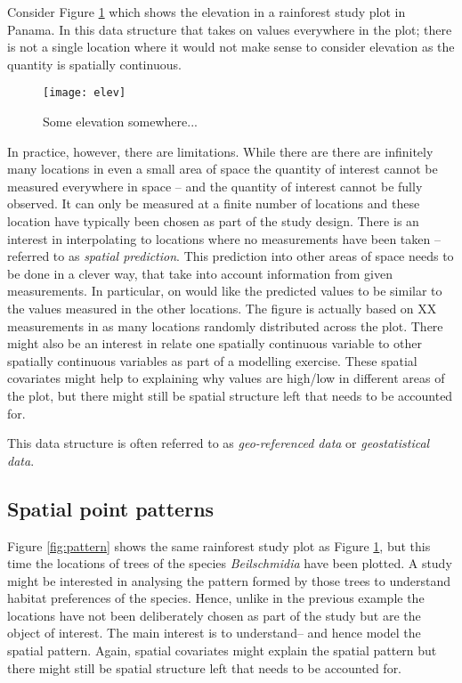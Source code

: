 Consider Figure \ref{fig:elev} which shows the elevation in a rainforest study plot in Panama. In this data structure that  takes on values everywhere in the plot; there is not a single location where it would not make sense to consider elevation as the quantity is spatially continuous.
\begin{figure}
\centering
\texttt{[image: elev]}
\caption{\label{fig:elev} Some elevation somewhere...}
\end{figure}
In practice, however, there are limitations. While there are there are infinitely many locations in even a small area of space the quantity of interest cannot be measured everywhere in space -- and the quantity of interest cannot be fully observed. It can only be measured at a finite number of locations and these location have typically been chosen as part of the study design. There is an interest in interpolating to locations where no measurements have been taken -- referred to as \textit{spatial prediction}. This prediction into other areas of space needs to be done in a clever way, that take into account information from given measurements. In particular, on would like the predicted values to be similar to the values measured in the other locations. The figure is actually based on XX measurements in as many locations randomly distributed across the plot. There might also be an interest in relate one spatially continuous variable to other spatially continuous variables as part of a modelling exercise. These spatial covariates might help to explaining why values are high/low in different areas of the plot, but there might still be spatial structure left that needs to be accounted for.

This data structure is often referred to as \textit{geo-referenced data} or \textit{geostatistical data}.

\subsection{Spatial point patterns}
Figure \ref{fig:pattern} shows  the same rainforest study plot as Figure \ref{fig:elev}, but this time the locations of trees of the species \textit{Beilschmidia} have been plotted. A study might be interested in analysing the pattern formed by those trees to understand habitat preferences of the species. Hence, unlike in the previous example the locations have not been deliberately chosen as part of the study but are the object of interest. The main interest is to understand-- and hence model the spatial pattern.
Again, spatial covariates might explain the spatial pattern but there might still be spatial structure left that needs to be accounted for.

